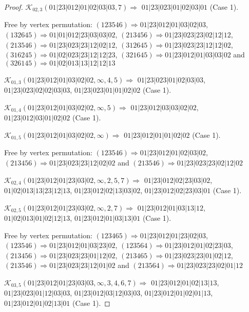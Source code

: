 \documentclass[12pt]{article}
\theoremstyle{plain}
\theoremstyle{definition}
\theoremstyle{remark}
\newcommand{\fancy}[1]{\mathcal{#1}}
\def\K{\fancy{K}}
\begin{document}
\begin{proof}
	$\K_{02,3}(01|23|012|01|02|03|03,7)\Rightarrow $ $01|23|023|01|02|03|01$ (Case 1).
	
	
	
	Free by vertex permutation: $(1 2 3 5 4 6)\Rightarrow 01|23|012|01|03|02|03$, $(1 3 2 6 4 5)\Rightarrow 01|01|012|23|03|03|02$, $(2 1 3 4 5 6)\Rightarrow 01|23|023|23|02|12|12$, $(2 1 3 5 4 6)\Rightarrow 01|23|023|23|12|02|12$, $(3 1 2 6 4 5)\Rightarrow 01|23|023|23|12|12|02$, $(3 1 6 2 4 5)\Rightarrow 01|02|023|23|12|12|23$, $(3 2 1 6 4 5)\Rightarrow 01|23|012|01|03|03|02$ and $(3 2 6 1 4 5)\Rightarrow 01|02|013|13|12|12|13$
	
	
	
	\bigskip
	
	$\K_{01,3}(01|23|012|01|03|02|02,\infty,4, 5)\Rightarrow $ $01|23|023|01|02|03|03$, $01|23|023|02|02|03|03$, $01|23|023|01|01|02|02$ (Case 1).
	
	$\K_{01,4}(01|23|012|01|03|02|02,\infty,5)\Rightarrow $ $01|23|012|03|03|02|02$, $01|23|012|03|01|02|02$ (Case 1).
	
	$\K_{01,5}(01|23|012|01|03|02|02,\infty)\Rightarrow $ $01|23|012|01|01|02|02$ (Case 1).
	
	
	
	Free by vertex permutation: $(1 2 3 5 4 6)\Rightarrow 01|23|012|01|02|03|02$, $(2 1 3 4 5 6)\Rightarrow 01|23|023|23|12|02|02$ and $(2 1 3 5 4 6)\Rightarrow 01|23|023|23|02|12|02$
	
	
	
	\bigskip
	
	$\K_{02,4}(01|23|012|01|23|03|02,\infty,2, 5, 7)\Rightarrow $ $01|23|012|02|23|03|02$, $01|02|013|13|23|12|13$, $01|23|012|02|13|03|02$, $01|23|012|02|23|03|01$ (Case 1).
	
	$\K_{02,5}(01|23|012|01|23|03|02,\infty,2, 7)\Rightarrow $ $01|23|012|01|03|13|12$, $01|02|013|01|02|12|13$, $01|23|012|01|03|13|01$ (Case 1).
	
	
	
	Free by vertex permutation: $(1 2 3 4 6 5)\Rightarrow 01|23|012|01|23|02|03$, $(1 2 3 5 4 6)\Rightarrow 01|23|012|01|03|23|02$, $(1 2 3 5 6 4)\Rightarrow 01|23|012|01|02|23|03$, $(2 1 3 4 5 6)\Rightarrow 01|23|023|23|01|12|02$, $(2 1 3 4 6 5)\Rightarrow 01|23|023|23|01|02|12$, $(2 1 3 5 4 6)\Rightarrow 01|23|023|23|12|01|02$ and $(2 1 3 5 6 4)\Rightarrow 01|23|023|23|02|01|12$
	
	
	
	\bigskip
	
	$\K_{03,5}(01|23|012|01|23|03|03,\infty,3, 4, 6, 7)\Rightarrow $ $01|23|012|01|02|13|13$, $01|23|023|01|12|03|03$, $01|23|012|03|12|03|03$, $01|23|012|01|02|01|13$, $01|23|012|01|02|13|01$ (Case 1).
	

\end{proof}
\end{document}
